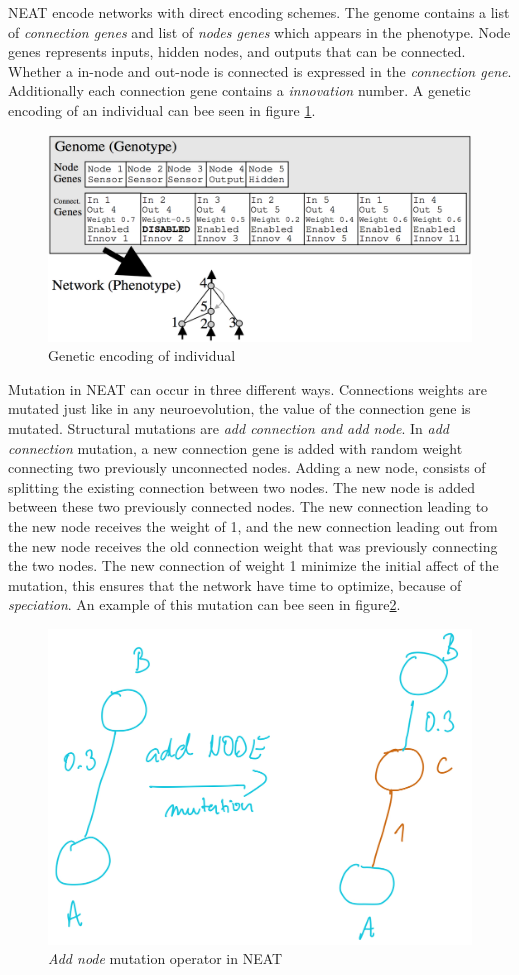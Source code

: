\documentclass[format=acmsmall, review=false, screen=true]{acmart}
\begin{document}
NEAT encode networks with direct encoding schemes. The genome contains a list of \emph{connection genes} and list of \emph{nodes genes} which appears in the phenotype. Node genes represents inputs, hidden nodes, and outputs that can be connected. Whether a in-node and out-node is connected is expressed in the \emph{connection gene}. Additionally each connection gene contains a \emph{innovation} number. A genetic encoding of an individual can bee seen in figure \ref{fig:genome}.

\begin{figure}[H]
  \includegraphics[width=0.66\linewidth]{img/neat_encoding.PNG}
  \caption{\label{fig:genome}Genetic encoding of individual}
\end{figure}

Mutation in NEAT can occur in three different ways. Connections weights are mutated just like in any neuroevolution, the value of the connection gene is mutated. Structural mutations are \emph{add connection and add node}. In \emph{add connection} mutation, a new connection gene is added with random weight connecting two previously unconnected nodes. Adding a new node, consists of splitting the existing connection between two nodes. The new node is added between these two previously connected nodes. The new connection leading to the new node receives the weight of 1, and the new connection leading out from the new node receives the old connection weight that was previously connecting the two nodes. The new connection of weight 1 minimize the initial affect of the mutation, this ensures that the network have time to optimize, because of \emph{speciation}. An example of this mutation can bee seen in figure\ref{fig:add_node}.

\begin{figure}[H]
  \includegraphics[width=0.56\linewidth]{img/add_node.JPEG}
  \caption{\label{fig:add_node}\emph{Add node} mutation operator in NEAT}
\end{figure}
\end{document}
